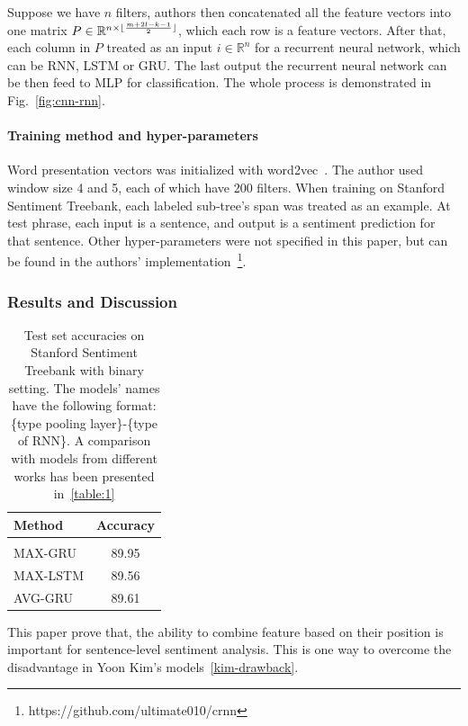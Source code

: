 Suppose we have \(n\) filters, authors then concatenated all the feature vectors into one matrix \(P \in \mathbb{R}^{n \times \lfloor \frac{m + 2l - k - 1}{2} \rfloor}\), which each row is a feature vectors. 
After that, each column in \(P\) treated as an input \(i \in \mathbb{R}^{n}\) for a recurrent neural network, which can be RNN, LSTM or GRU.
The last output the recurrent neural network can be then feed to MLP for classification.
The whole process is demonstrated in Fig.~\ref{fig:cnn-rnn}.

\paragraph{Training method and hyper-parameters} 
Word presentation vectors was initialized with word2vec~\cite{word2vec}.
The author used window size 4 and 5, each of which have 200 filters. 
When training on Stanford Sentiment Treebank, each labeled sub-tree's span was treated as an example.
At test phrase, each input is a sentence, and output is a sentiment prediction for that sentence.
Other hyper-parameters were not specified in this paper, but can be found in the authors' implementation~\footnote{https://github.com/ultimate010/crnn}.

\subsubsection{Results and Discussion}
\begin{table}[H]
\centering
\begin{tabular}{l c} 
 \hline
 \hline 
 Method & Accuracy \\ [0.5ex] 
 \hline
 \hline
 \\  
 MAX-GRU & 89.95 \\ 
 MAX-LSTM & 89.56 \\ 
 AVG-GRU & 89.61 \\ 
 \hline
 \hline
\end{tabular}
\caption{Test set accuracies on Stanford Sentiment Treebank with binary setting. 
The models' names have the following format: \{type pooling layer\}-\{type of RNN\}.
A comparison with models from different works has been presented in~\ref{table:1}}
\label{table:cnn-rnn}
\end{table}

This paper prove that, the ability to combine feature based on their position is important for sentence-level sentiment analysis. 
This is one way to overcome the disadvantage in Yoon Kim's models~\ref{kim-drawback}.

